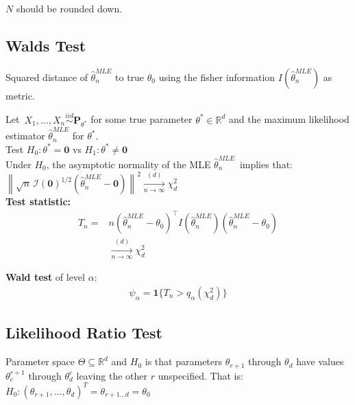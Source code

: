 $N$ should be rounded down.

\subsection{Walds Test}

Squared distance of $\widehat{\theta}_ n^{MLE}$ to true $\theta_0$ using the fisher information $I(\widehat{\theta}_ n^{MLE})$ as metric.

Let $\, X_1, \ldots , X_ n \stackrel{iid}{\sim } \mathbf{P}_{\theta ^*}$ for some true parameter $\theta ^* \in \mathbb {R}^ d$ and the  maximum likelihood estimator $\widehat{\theta }_ n^{MLE}$ for $\theta ^*$.\\

Test $H_0: \displaystyle  \theta ^* = \mathbf{0}$ vs $H_1: \displaystyle  \theta ^* \neq \mathbf{0}$\\

Under $H_0$, the asymptotic normality of the MLE $\widehat{\theta }_ n^{MLE}\,$ implies that:\\

$\left\lVert \sqrt{n}\, \mathcal{I}(\mathbf{0})^{1/2}(\widehat{\theta }_ n^{MLE}- \mathbf{0}) \right\rVert ^2 \xrightarrow [n\to \infty ]{(d)} \chi ^2_ d\,$\\

\textbf{Test statistic:}
\begin{align*}
T_n = &
n(\widehat{\theta}_ n^{MLE} - \theta_0)^\top I(\widehat{\theta}_ n^{MLE}) (\widehat{\theta}_ n^{MLE} - \theta_0)\\
&\xrightarrow [n\to \infty ]{(d)} \chi ^2_ d
\end{align*}

\textbf{Wald test} of level $\alpha$:
\begin{align*}
\psi_\alpha = \mathbf{1}\{T_n > q_\alpha(\chi^2_d)\}
\end{align*}


\subsection{Likelihood Ratio Test}
Parameter space $\Theta \subseteq \mathbb{R}^d$ and $H_0$ is that parameters $\theta_{r+1}$ through $\theta_d$ have values $\theta_c^{r+1}$ through $\theta^c_d$ leaving the other $r$ unspecified. That is:\\
$H_0: (\theta_{r+1}, ..., \theta_d)^T = \theta_{r+1...d} = \theta_0$\\

